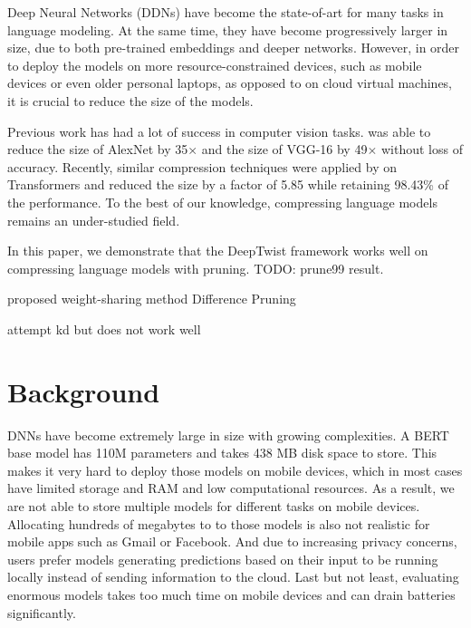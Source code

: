 \documentclass[10pt]{article}
\begin{document}
Deep Neural Networks (DDNs) have become the state-of-art for many tasks in
language modeling. At the same time, they have become progressively larger in
size, due to both pre-trained embeddings and deeper networks.
However, in order to deploy the models on more resource-constrained devices,
such as mobile devices or even older personal laptops, as opposed to on cloud
virtual machines, it is crucial to reduce the size of the models.

Previous work has had a lot of success in computer vision tasks.
\citet{han2015deep} was able to reduce the size of AlexNet by 35$\times$ and
the size of VGG-16 by 49$\times$ without loss of accuracy.
Recently, similar compression techniques were applied by
\citet{cheong2014transformer} on Transformers and reduced the size by a factor
of 5.85 while retaining 98.43\% of the performance. To the best of our
knowledge, compressing language models remains an under-studied field.


In this paper, we demonstrate that the DeepTwist framework works well on
compressing language models with pruning. {\color{red} TODO: prune99 result}.

proposed weight-sharing method Difference Pruning

attempt kd but does not work well

\section{Background}


DNNs have become extremely large in size with growing complexities. A BERT
base model has 110M parameters and takes 438 MB disk space to store. This
makes it very hard to deploy those models on mobile devices, which in most
cases have limited storage and RAM and low computational resources. As a
result, we are not able to store multiple models for different tasks on mobile
devices. Allocating hundreds of megabytes to to those models is also not
realistic for mobile apps such as Gmail or Facebook. And due to increasing
privacy concerns, users prefer models generating predictions based on their
input to be running locally instead of sending information to the cloud. Last
but not least, evaluating enormous models takes too much time on mobile
devices and can drain batteries significantly.
\end{document}

